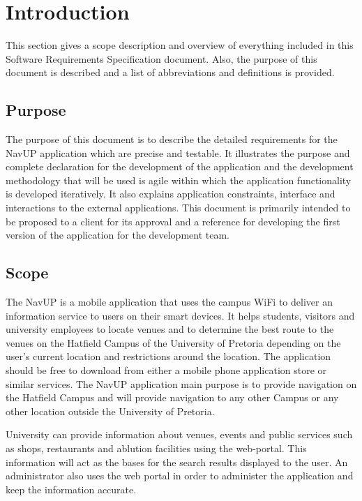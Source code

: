 \documentclass[12pt,a4paper]{article}
\begin{document}


\tableofcontents
\newpage

\section{Introduction}
This section gives a scope description and overview of everything included in this Software Requirements Specification document. Also, the purpose of this document is described and a list of abbreviations and definitions is provided. 
	\subsection{Purpose}
	The purpose of this document is to describe the detailed requirements for the NavUP application which are precise and testable. It illustrates the purpose and complete declaration for the development of the application and the development methodology that will be used is agile within which the application functionality is developed iteratively. It also explains application constraints, interface and interactions to the external applications. This document is primarily intended to be proposed to a client for its approval and a reference for developing the first version of the application for the development team. 
	\subsection{Scope}
	The NavUP is a mobile application that uses the campus WiFi to deliver an information service to users on their smart devices. It helps students, visitors and university employees to locate venues and to determine the best route to the venues on the Hatfield Campus of the University of Pretoria depending on the user’s current location and restrictions around the location. The application should be free to download from either a mobile phone application store or similar services. The NavUP application main purpose is to provide navigation on the Hatfield Campus and will provide navigation to any other Campus or any other location outside the University of Pretoria. \newline
	
	University can provide information about venues, events and public services such as shops, restaurants and ablution facilities using the web-portal. This information will act as the bases for the search results displayed to the user. An administrator also uses the web portal in order to administer the application and keep the information accurate.
\newline
\end{document}
